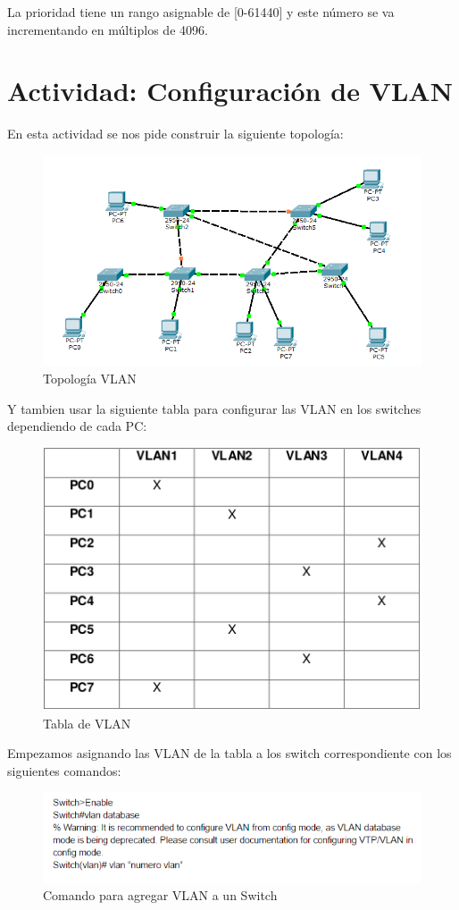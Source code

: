 \documentclass[onecolumn,11pts]{IEEEtran}
\begin{document}
La prioridad tiene un rango asignable de [0-61440] y este número se va incrementando en múltiplos de 4096.
\newpage
\section{Actividad: Configuración de VLAN}

En esta actividad se nos pide construir la siguiente topología:

\begin{figure}[h!]
\centering
 \includegraphics[scale=0.5]{ss1}
\caption{Topología VLAN}
\label{fig:ss1}
\end{figure}
Y tambien usar la siguiente tabla para configurar las VLAN en los switches dependiendo de cada PC:
\begin{figure}[h!]
\centering
 \includegraphics[scale=0.8]{tablavlan}
\caption{Tabla de VLAN}
\label{fig:tablavlan}
\end{figure}
\newpage
Empezamos asignando las VLAN de la tabla a los switch correspondiente con los siguientes comandos:
\begin{figure}[h!]
\centering
 \includegraphics[scale=0.8]{agvlan}
\caption{Comando para agregar VLAN a un Switch}
\label{fig:tablavlan}
\end{figure}
\end{document}
